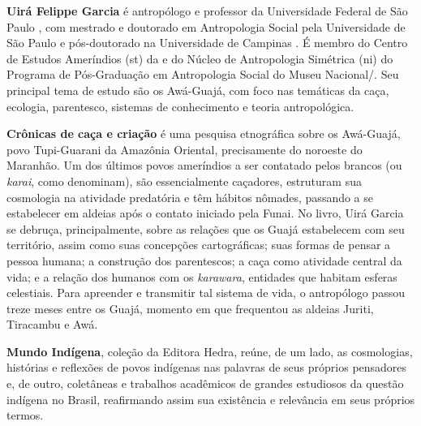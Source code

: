 \textbf{Uirá Felippe Garcia} é antropólogo e professor da Universidade Federal de São Paulo , com mestrado e doutorado em Antropologia Social pela Universidade de São Paulo  e pós-doutorado na Universidade de Campinas . É membro do Centro de Estudos Ameríndios (st) da  e do Núcleo de Antropologia Simétrica (ni) do Programa de Pós-Graduação em Antropologia Social do Museu Nacional/. Seu principal tema de estudo são os Awá-Guajá, com foco nas temáticas da caça, ecologia, parentesco, sistemas de conhecimento e teoria antropológica.

	
\textbf{Crônicas de caça e criação} é uma pesquisa etnográfica sobre os Awá-Guajá, povo Tupi-Guarani da Amazônia Oriental, precisamente do noroeste do Maranhão. Um dos últimos povos ameríndios a ser contatado pelos brancos (ou \emph{karai}, como denominam), são essencialmente caçadores, estruturam sua cosmologia na atividade predatória e têm hábitos nômades, passando a se estabelecer em aldeias após o contato iniciado pela Funai. No livro, Uirá Garcia se debruça, principalmente, sobre as relações que os Guajá estabelecem com seu território, assim como suas concepções cartográficas; suas formas de pensar a pessoa humana; a construção dos parentescos; a caça como atividade central da vida; e a relação dos humanos com os \emph{karawara}, entidades que habitam esferas celestiais. Para apreender e transmitir tal sistema de vida, o antropólogo passou treze meses entre os Guajá, momento em que frequentou as aldeias Juriti, Tiracambu e Awá.


\textbf{Mundo Indígena}, coleção da Editora Hedra, reúne, de um lado, as cosmologias, histórias
e reflexões de povos indígenas nas palavras de seus próprios pensadores e, de outro, coletâneas
e trabalhos acadêmicos de grandes estudiosos da questão indígena no Brasil, reafirmando assim sua
existência e relevância em seus próprios termos.\par